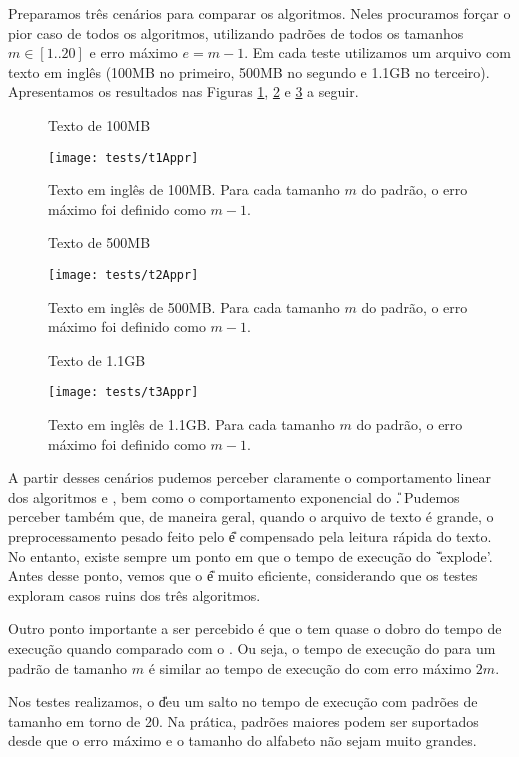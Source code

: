 \documentclass[]{article}
\begin{document}
Preparamos três cenários para comparar os algoritmos. Neles procuramos forçar o pior caso de todos os algoritmos, utilizando padrões de todos os tamanhos $m \in [1..20]$ e erro máximo $e = m - 1$. Em cada teste utilizamos um arquivo com texto em inglês (100MB no primeiro, 500MB no segundo e 1.1GB no terceiro). Apresentamos os resultados nas Figuras \ref{fig:a1}, \ref{fig:a2} e \ref{fig:a3} a seguir.

\begin{figure}[h]
	{\centering Texto de 100MB\par}
	\texttt{[image: tests/t1Appr]}
\caption{Texto em inglês de 100MB. Para cada tamanho $m$ do padrão, o erro máximo foi definido como $m-1$.}
\label{fig:a1}
\end{figure}

\begin{figure}[h]
	{\centering Texto de 500MB\par}
	\texttt{[image: tests/t2Appr]}
\caption{Texto em inglês de 500MB. Para cada tamanho $m$ do padrão, o erro máximo foi definido como $m-1$.}
\label{fig:a2}
\end{figure}

\begin{figure}[h]
	{\centering Texto de 1.1GB\par}
	\texttt{[image: tests/t3Appr]}
\caption{Texto em inglês de 1.1GB. Para cada tamanho $m$ do padrão, o erro máximo foi definido como $m-1$.}
\label{fig:a3}
\end{figure}

A partir desses cenários pudemos perceber claramente o comportamento linear dos algoritmos \W e \SE, bem como o comportamento exponencial do \U. Pudemos perceber também que, de maneira geral, quando o arquivo de texto é grande, o preprocessamento pesado feito pelo \U é compensado pela leitura rápida do texto. No entanto, existe sempre um ponto em que o tempo de execução do \U `explode'. Antes desse ponto, vemos que o \U é muito eficiente, considerando que os testes exploram casos ruins dos três algoritmos. 

Outro ponto importante a ser percebido é que o \SE tem quase o dobro do tempo de execução quando comparado com o \W. Ou seja, o tempo de execução do \SE para um padrão de tamanho $m$ é similar ao tempo de execução do \W com erro máximo $2m$.

Nos testes realizamos, o \U deu um salto no tempo de execução com padrões de tamanho em torno de 20. Na prática, padrões maiores podem ser suportados desde que o erro máximo e o tamanho do alfabeto não sejam muito grandes.
\end{document}
